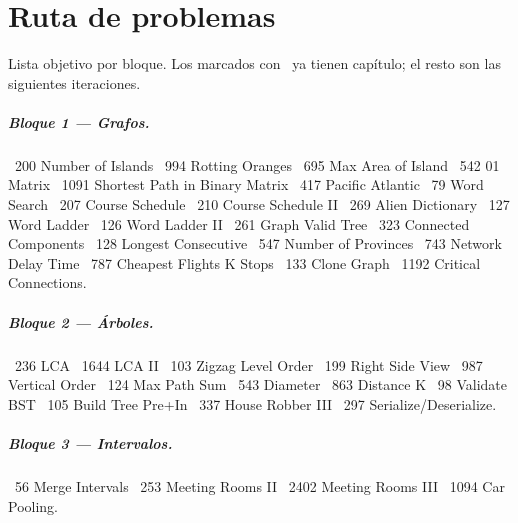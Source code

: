 \chapter{Ruta de problemas}

Lista objetivo por bloque. Los marcados con \checkmark\ ya tienen capítulo;
el resto son las siguientes iteraciones.

\paragraph{Bloque 1 — Grafos.}
\checkmark\ 200 Number of Islands \textbullet{}
\checkmark\ 994 Rotting Oranges \textbullet{}
\checkmark\ 695 Max Area of Island \textbullet{}
\checkmark\ 542 01 Matrix \textbullet{}
\checkmark\ 1091 Shortest Path in Binary Matrix \textbullet{}
\checkmark\ 417 Pacific Atlantic \textbullet{}
\checkmark\ 79 Word Search \textbullet{}
\checkmark\ 207 Course Schedule \textbullet{}
\checkmark\ 210 Course Schedule II \textbullet{}
\checkmark\ 269 Alien Dictionary \textbullet{}
\checkmark\ 127 Word Ladder \textbullet{}
\checkmark\ 126 Word Ladder II \textbullet{}
\checkmark\ 261 Graph Valid Tree \textbullet{}
\checkmark\ 323 Connected Components \textbullet{}
\checkmark\ 128 Longest Consecutive \textbullet{}
\checkmark\ 547 Number of Provinces \textbullet{}
\checkmark\ 743 Network Delay Time \textbullet{}
\checkmark\ 787 Cheapest Flights K Stops \textbullet{}
\checkmark\ 133 Clone Graph \textbullet{}
\checkmark\ 1192 Critical Connections.

\paragraph{Bloque 2 — Árboles.}
\checkmark\ 236 LCA \textbullet{}
\checkmark\ 1644 LCA II \textbullet{}
\checkmark\ 103 Zigzag Level Order \textbullet{}
\checkmark\ 199 Right Side View \textbullet{}
\checkmark\ 987 Vertical Order \textbullet{}
\checkmark\ 124 Max Path Sum \textbullet{} \checkmark\ 543 Diameter \textbullet{} \checkmark\ 863 Distance K \textbullet{}
\checkmark\ 98 Validate BST \textbullet{} \checkmark\ 105 Build Tree Pre+In \textbullet{}
\checkmark\ 337 House Robber III \textbullet{} \checkmark\ 297 Serialize/Deserialize.

\paragraph{Bloque 3 — Intervalos.}
\checkmark\ 56 Merge Intervals \textbullet{} \checkmark\ 253 Meeting Rooms II \textbullet{}
\checkmark\ 2402 Meeting Rooms III \textbullet{} \checkmark\ 1094 Car Pooling.

